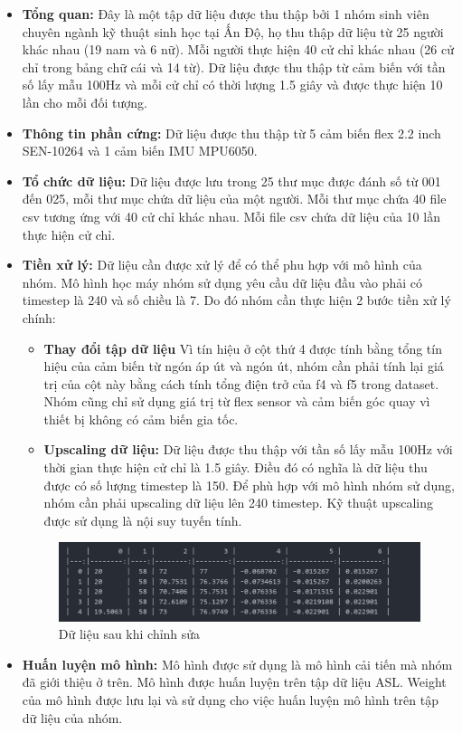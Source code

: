 \begin{itemize}
    \item \textbf{Tổng quan:} Đây là một tập dữ liệu được thu thập bởi 1 nhóm sinh viên chuyên ngành kỹ thuật sinh học tại Ấn Độ, họ thu thập dữ liệu từ 25 người khác nhau (19 nam và 6 nữ). Mỗi người thực hiện 40 cử chỉ khác nhau (26 cử chỉ trong bảng chữ cái và 14 từ). Dữ liệu được thu thập từ cảm biến với tần số lấy mẫu 100Hz và mỗi cử chỉ có thời lượng 1.5 giây và được thực hiện 10 lần cho mỗi đối tượng.
    \item \textbf{Thông tin phần cứng:} Dữ liệu được thu thập từ 5 cảm biến flex 2.2 inch SEN-10264 và 1 cảm biến IMU MPU6050.
    \item \textbf{Tổ chức dữ liệu:} Dữ liệu được lưu trong 25 thư mục được đánh số từ 001 đến 025, mỗi thư mục chứa dữ liệu của một người. Mỗi thư mục chứa 40 file csv tương ứng với 40 cử chỉ khác nhau. Mỗi file csv chứa dữ liệu của 10 lần thực hiện cử chỉ. 
    \item \textbf{Tiền xử lý:} Dữ liệu cần được xử lý để có thể phu hợp với mô hình của nhóm. Mô hình học máy nhóm sử dụng yêu cầu dữ liệu đầu vào phải có timestep là 240 và số chiều là 7. Do đó nhóm cần thực hiện 2 bước tiền xử lý chính:
    \begin{itemize}
        \item \textbf{Thay đổi tập dữ liệu} Vì tín hiệu ở cột thứ 4 được tính bằng tổng tín hiệu của cảm biến từ ngón áp út và ngón út, nhóm cần phải tính lại giá trị của cột này bằng cách tính tổng điện trở của f4 và f5 trong dataset. Nhóm cũng chỉ sử dụng giá trị từ flex sensor và cảm biến góc quay vì thiết bị không có cảm biến gia tốc.
        \item \textbf{Upscaling dữ liệu:} Dữ liệu được thu thập với tần số lấy mẫu 100Hz với thời gian thực hiện cử chỉ là 1.5 giây. Điều đó có nghĩa là dữ liệu thu được có số lượng timestep là 150. Để phù hợp với mô hình nhóm sử dụng, nhóm cần phải upscaling dữ liệu lên 240 timestep. Kỹ thuật upscaling được sử dụng là nội suy tuyến tính.
    \end{itemize}
    \begin{figure}[H]
        \centering
        \includegraphics[width=0.8\linewidth]{Images/Improved methods/transfer_learning.png}
        \caption{Dữ liệu sau khi chỉnh sửa}
        \label{fig:interpolation}
    \end{figure}
    \item \textbf{Huấn luyện mô hình:} Mô hình được sử dụng là mô hình cải tiến mà nhóm đã giới thiệu ở trên. Mô hình được huấn luyện trên tập dữ liệu ASL. Weight của mô hình được lưu lại và sử dụng cho việc huấn luyện mô hình trên tập dữ liệu của nhóm.
\end{itemize}